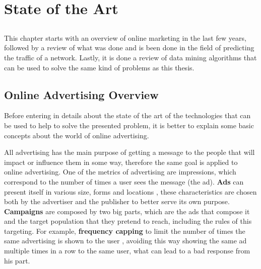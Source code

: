 \chapter{State of the Art} \label{chap:sota}

\section*{}

This chapter starts with an overview of online marketing in the last few years, followed by a review of
what was done and is been done in the field of predicting the traffic of a network.
Lastly, it is done a review of data mining algorithms that can be used to solve the same kind of problems as this thesis.

\section{Online Advertising Overview}

Before entering in details about the state of the art of the technologies that can be used to
help to solve the presented problem, it is better to explain some basic concepts about the world of online advertising.

All advertising has the main purpose of getting a message to the people that will impact or influence them in some way,
therefore the same goal is applied to online advertising.
One of the metrics of advertising are impressions, which correspond to the number of times a user sees the message (the ad).\cite{kOA}
\textbf{Ads} can present itself in various size\cite{kOA2}, forms and locations \cite{kOA3}, these characteristics are chosen both by the advertiser
and the publisher to better serve its own purpose.
\textbf{Campaigns} are composed by two big parts, which are the ads that compose it and the target population that they pretend to reach,
including the rules of this targeting. For example, \textbf{frequency capping} to limit the number of times the same advertising is shown to the user \cite{kOA},
avoiding this way showing the same ad multiple times in a row to the same user, what can lead to a bad response from his part.\cite{Buchbinder20141}

